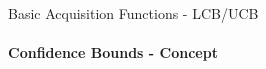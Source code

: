\begin{frame}[c]{Basic Acquisition Functions - LCB/UCB}
\framesubtitle{Confidence Bounds - Concept}


\end{frame}
